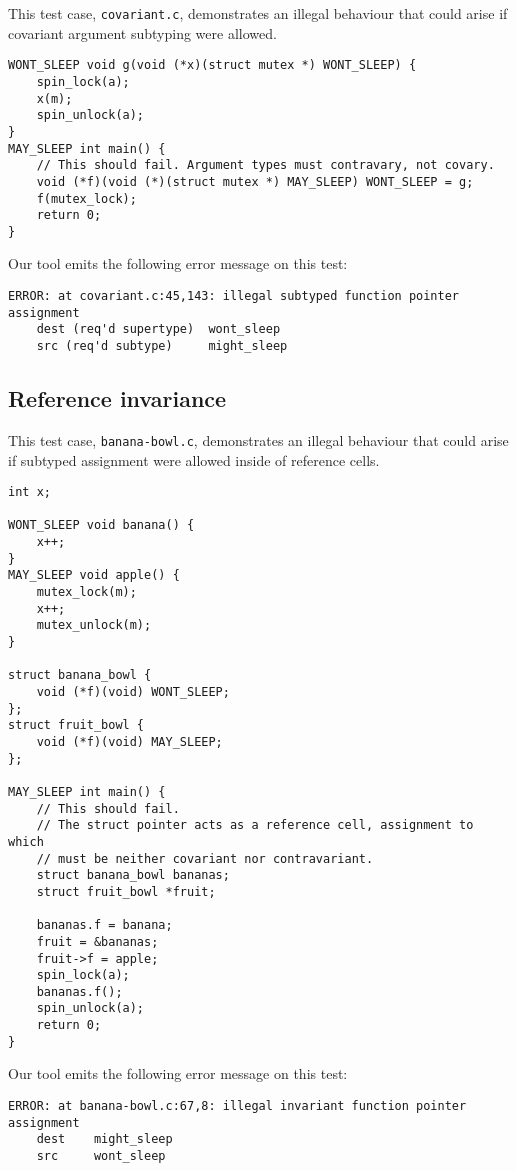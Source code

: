 \documentclass{article}
\begin{document}
This test case, \texttt{covariant.c}, demonstrates an illegal behaviour that could arise if covariant argument subtyping were allowed.

\begin{verbatim}
WONT_SLEEP void g(void (*x)(struct mutex *) WONT_SLEEP) {
    spin_lock(a);
    x(m);
    spin_unlock(a);
}
MAY_SLEEP int main() {
    // This should fail. Argument types must contravary, not covary.
    void (*f)(void (*)(struct mutex *) MAY_SLEEP) WONT_SLEEP = g;
    f(mutex_lock);
    return 0;
}
\end{verbatim}

Our tool emits the following error message on this test:
\begin{verbatim}
ERROR: at covariant.c:45,143: illegal subtyped function pointer assignment
    dest (req'd supertype)  wont_sleep
    src (req'd subtype)     might_sleep
\end{verbatim}

\subsection{Reference invariance}

This test case, \texttt{banana-bowl.c}, demonstrates an illegal behaviour that could arise if subtyped assignment were allowed inside of reference cells.

\begin{verbatim}
int x;

WONT_SLEEP void banana() {
    x++;
}
MAY_SLEEP void apple() {
    mutex_lock(m);
    x++;
    mutex_unlock(m);
}

struct banana_bowl {
    void (*f)(void) WONT_SLEEP;
};
struct fruit_bowl {
    void (*f)(void) MAY_SLEEP;
};

MAY_SLEEP int main() {
    // This should fail.
    // The struct pointer acts as a reference cell, assignment to which
    // must be neither covariant nor contravariant.
    struct banana_bowl bananas;
    struct fruit_bowl *fruit;

    bananas.f = banana;
    fruit = &bananas;
    fruit->f = apple;
    spin_lock(a);
    bananas.f();
    spin_unlock(a);
    return 0;
}
\end{verbatim}

Our tool emits the following error message on this test:
\begin{verbatim}
ERROR: at banana-bowl.c:67,8: illegal invariant function pointer assignment
    dest    might_sleep
    src     wont_sleep
\end{verbatim}
\end{document}
